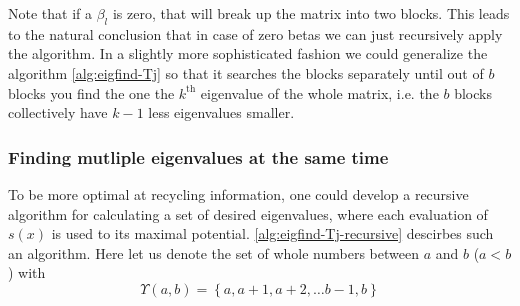 \documentclass{article}
\begin{document}
Note that if a $\beta_l$ is zero, that will break up the matrix into two blocks. This leads to the natural conclusion that in case of zero betas we can just recursively apply the algorithm. In a slightly more sophisticated fashion we could generalize the algorithm \autoref{alg:eigfind-Tj} so that it searches the blocks separately until out of $b$ blocks you find the one the $k^{\mathrm{th}}$ eigenvalue of the whole matrix, i.e. the $b$ blocks collectively have $k-1$ less eigenvalues smaller.

\subsubsection*{Finding mutliple eigenvalues at the same time}

To be more optimal at recycling information, one could develop a recursive algorithm for calculating a set of desired eigenvalues, where each evaluation of $s(x)$ is used to its maximal potential. \autoref{alg:eigfind-Tj-recursive} descirbes such an algorithm. Here let us denote the set of whole numbers between $a$ and $b$ ($a<b$) with 
\begin{equation*}
	\Upsilon(a,b) = \left\lbrace a, a+1, a+2, \dots b-1, b\right\rbrace
\end{equation*}
\end{document}
